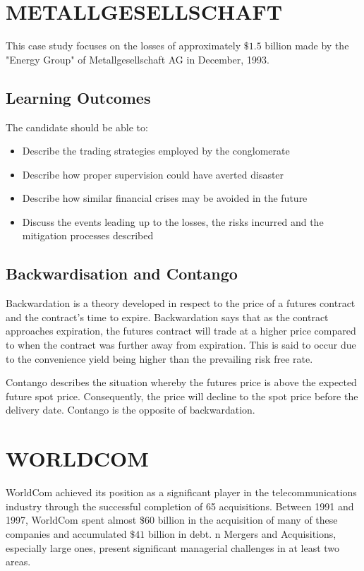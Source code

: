 \documentclass[]{article}
\begin{document}
\newpage
\section{METALLGESELLSCHAFT}

This case study focuses on the losses of approximately $\$1.5$ billion made by the "Energy Group" of Metallgesellschaft AG in December, 1993.

\subsection{Learning Outcomes}
The candidate should be able to:
\begin{itemize}
\item Describe the trading strategies employed by the conglomerate
\item Describe how proper supervision could have averted disaster
\item Describe how similar financial crises may be avoided in the future
\item Discuss the events leading up to the losses, the risks incurred and the
mitigation processes described
\end{itemize}
\subsection{Backwardisation and Contango}

Backwardation  is a theory developed in respect to the price of a futures contract and the contract's time to expire. Backwardation says that as the contract approaches expiration, the futures contract will trade at a higher price compared to when the contract was further away from expiration. This is said to occur due to the convenience yield being higher than the prevailing risk free rate.
 
Contango describes the situation whereby the futures price is above the expected future spot price. Consequently, the price will decline to the spot price before the delivery date. Contango is the opposite of backwardation.
\newpage
\section{WORLDCOM}

WorldCom achieved its position as a significant player in the telecommunications industry through the successful completion of 65 acquisitions. Between 1991 and 1997, WorldCom spent almost $\$60$
 billion in the acquisition of many of these companies and accumulated $\$41$ billion in debt.
n Mergers and Acquisitions, especially large ones, present significant managerial challenges in at least two areas.
\end{document}
